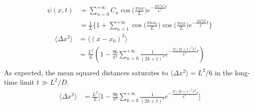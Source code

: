 \begin{align*}
  \psi(x,t) &= \sum_{n=0}^{+\infty} C_n \cos\Big(\frac{\pi n x}{L}\Big) e^{- \frac{D\pi^2
  n^2}{L^2}t}\\
            &=\frac{1}{L} \Bigg\{ 1 + \sum_{n=1}^{+\infty} \cos\Big(\frac{\pi n
  x_0}{L}\Big) \cos\Big(\frac{\pi n x}{L}\Big) e^{- \frac{D\pi^2  n^2}{L^2}t}\Bigg\}
\end{align*}
\begin{align*}
  \langle \Delta x^2 \rangle &= \langle(x-x_0)^2\rangle\\&= \frac{L^2}{6}(1 -
  \frac{96}{\pi^4}
  \sum_{n=0}^{+\infty} \frac{1}{(2k+1)^4} e^{- \frac{D(2k+1)^2 \pi^2}{L^2}t})\\
\end{align*}
As expected, the mean squared distances saturates to $\langle \Delta x^2 \rangle = L^2/6$
in the long-time limit $t \gg L^2 / D.$
\begin{align*}
  \langle \Delta x^2 \rangle &= \frac{L^2}{6}\Bigg[1 -
  \frac{96}{\pi^4}
  \sum_{k=0}^{+\infty} \frac{1}{(2k+1)^4} e^{- \frac{D(2k+1)^2 \pi^2}{L^2}t}\Bigg]\\
\end{align*}
